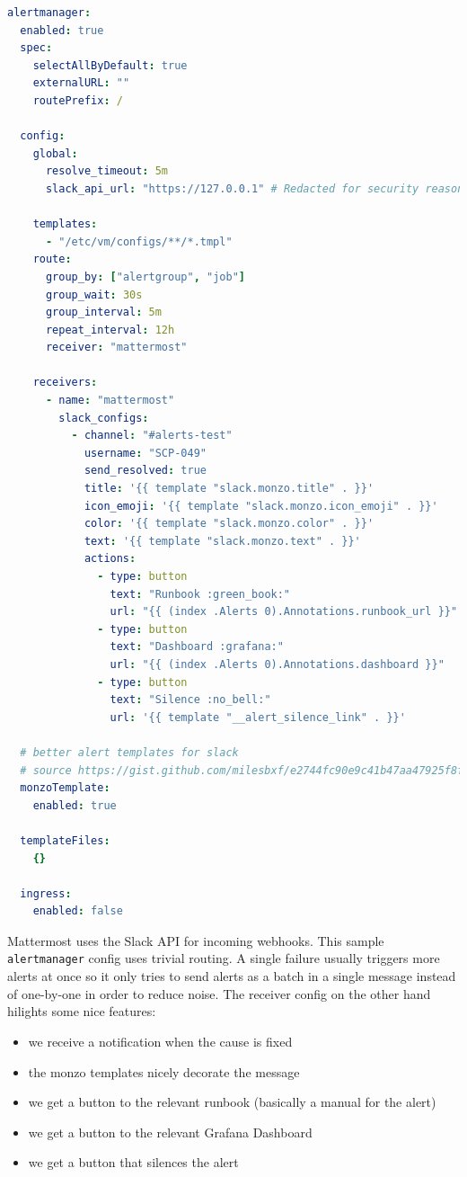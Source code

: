 \begin{lstlisting}[language=yaml,caption=alertmanager configuration]
alertmanager:
  enabled: true
  spec:
    selectAllByDefault: true
    externalURL: ""
    routePrefix: /

  config:
    global:
      resolve_timeout: 5m
	  slack_api_url: "https://127.0.0.1" # Redacted for security reasons

    templates:
      - "/etc/vm/configs/**/*.tmpl"
    route:
      group_by: ["alertgroup", "job"]
      group_wait: 30s
      group_interval: 5m
      repeat_interval: 12h
      receiver: "mattermost"

    receivers:
      - name: "mattermost"
        slack_configs:
          - channel: "#alerts-test"
            username: "SCP-049"
            send_resolved: true
            title: '{{ template "slack.monzo.title" . }}'
            icon_emoji: '{{ template "slack.monzo.icon_emoji" . }}'
            color: '{{ template "slack.monzo.color" . }}'
            text: '{{ template "slack.monzo.text" . }}'
            actions:
              - type: button
                text: "Runbook :green_book:"
                url: "{{ (index .Alerts 0).Annotations.runbook_url }}"
              - type: button
                text: "Dashboard :grafana:"
                url: "{{ (index .Alerts 0).Annotations.dashboard }}"
              - type: button
                text: "Silence :no_bell:"
                url: '{{ template "__alert_silence_link" . }}'

  # better alert templates for slack
  # source https://gist.github.com/milesbxf/e2744fc90e9c41b47aa47925f8ff6512
  monzoTemplate:
    enabled: true

  templateFiles:
    {}

  ingress:
    enabled: false
\end{lstlisting}

Mattermost uses the Slack API for incoming webhooks. This sample
\verb+alertmanager+ config uses trivial routing. A single failure usually
triggers more alerts at once so it only tries to send alerts as a batch in a
single message instead of one-by-one in order to reduce noise. The receiver
config on the other hand hilights some nice features:

\begin{itemize}
	\item we receive a notification when the cause is fixed
	\item the monzo templates nicely decorate the message
	\item we get a button to the relevant runbook (basically a manual for the alert)
	\item we get a button to the relevant Grafana Dashboard
	\item we get a button that silences the alert
\end{itemize}

